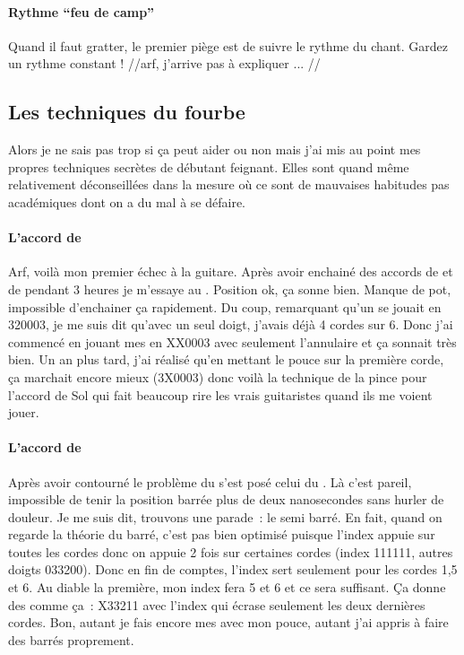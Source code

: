 \documentclass[online]{patacrep}
\begin{document}
\paragraph{Rythme ``feu de camp''} 
Quand il faut gratter, le premier piège est de suivre le rythme du
chant. Gardez un rythme constant !  //arf, j'arrive pas à expliquer
... //


\subsection{Les techniques du fourbe}

Alors je ne sais pas trop si ça peut aider ou non mais j'ai mis au
point mes propres techniques secrètes de débutant feignant. Elles sont
quand même relativement déconseillées dans la mesure où ce sont de
mauvaises habitudes pas académiques dont on a du mal à se défaire.

\paragraph{L'accord de }
Arf, voilà mon premier échec à la guitare. Après avoir enchainé des
accords de  et de  pendant 3 heures je
m'essaye au . Position ok, ça sonne bien. Manque de pot,
impossible d'enchainer ça rapidement.  Du coup, remarquant qu'un
 se jouait en 320003, je me suis dit qu'avec un seul
doigt, j'avais déjà 4 cordes sur 6. Donc j'ai commencé en jouant mes
 en XX0003 avec seulement l'annulaire et ça sonnait très
bien. Un an plus tard, j'ai réalisé qu'en mettant le pouce sur la
première corde, ça marchait encore mieux (3X0003) donc voilà la
technique de la pince pour l'accord de Sol qui fait beaucoup rire les
vrais guitaristes quand ils me voient jouer.

\paragraph{L'accord de }
Après avoir contourné le problème du  s'est posé celui du
. Là c'est pareil, impossible de tenir la position barrée
plus de deux nanosecondes sans hurler de douleur.  Je me suis dit,
trouvons une parade~: le semi barré.  En fait, quand on regarde la
théorie du barré, c'est pas bien optimisé puisque l'index appuie sur
toutes les cordes donc on appuie 2 fois sur certaines cordes (index
111111, autres doigts 033200). Donc en fin de comptes, l'index sert
seulement pour les cordes 1,5 et 6. Au diable la première, mon index
fera 5 et 6 et ce sera suffisant.  Ça donne des  comme ça~:
X33211 avec l'index qui écrase seulement les deux dernières
cordes. Bon, autant je fais encore mes  avec mon pouce,
autant j'ai appris à faire des barrés proprement.
\end{document}
